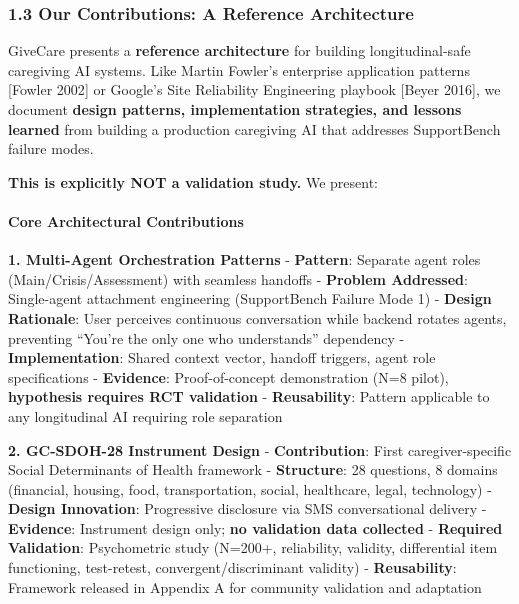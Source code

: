 \documentclass[
]{article}
\begin{document}
\subsubsection{1.3 Our Contributions: A Reference
Architecture}\label{our-contributions-a-reference-architecture}

GiveCare presents a \textbf{reference architecture} for building
longitudinal-safe caregiving AI systems. Like Martin Fowler's enterprise
application patterns {[}Fowler 2002{]} or Google's Site Reliability
Engineering playbook {[}Beyer 2016{]}, we document \textbf{design
patterns, implementation strategies, and lessons learned} from building
a production caregiving AI that addresses SupportBench failure modes.

\textbf{This is explicitly NOT a validation study.} We present:

\paragraph{Core Architectural
Contributions}\label{core-architectural-contributions}

\textbf{1. Multi-Agent Orchestration Patterns} - \textbf{Pattern}:
Separate agent roles (Main/Crisis/Assessment) with seamless handoffs -
\textbf{Problem Addressed}: Single-agent attachment engineering
(SupportBench Failure Mode 1) - \textbf{Design Rationale}: User
perceives continuous conversation while backend rotates agents,
preventing ``You're the only one who understands'' dependency -
\textbf{Implementation}: Shared context vector, handoff triggers, agent
role specifications - \textbf{Evidence}: Proof-of-concept demonstration
(N=8 pilot), \textbf{hypothesis requires RCT validation} -
\textbf{Reusability}: Pattern applicable to any longitudinal AI
requiring role separation

\textbf{2. GC-SDOH-28 Instrument Design} - \textbf{Contribution}: First
caregiver-specific Social Determinants of Health framework -
\textbf{Structure}: 28 questions, 8 domains (financial, housing, food,
transportation, social, healthcare, legal, technology) - \textbf{Design
Innovation}: Progressive disclosure via SMS conversational delivery -
\textbf{Evidence}: Instrument design only; \textbf{no validation data
collected} - \textbf{Required Validation}: Psychometric study (N=200+,
reliability, validity, differential item functioning, test-retest,
convergent/discriminant validity) - \textbf{Reusability}: Framework
released in Appendix A for community validation and adaptation
\end{document}
